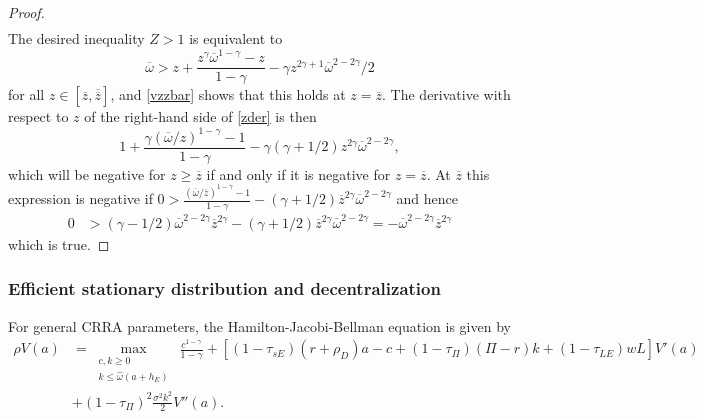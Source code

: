 \documentclass[11pt]{article}
\theoremstyle{plain}
\theoremstyle{definition} %
\begin{document}
\begin{proof}
\begin{equation}
\begin{aligned}
\label{vzzbar}
\end{aligned}
\end{equation} 
The desired inequality $Z > 1$ is equivalent to
\begin{equation}
\overline{\omega} > z + \frac{z^{\gamma}\overline{\omega}^{1 - \gamma} - z}{1 - \gamma} - \gamma z^{2\gamma+1} \overline{\omega}^{2 - 2\gamma}/2
\label{zder}
\end{equation}
for all $z \in [\overline{z}, \overline{\overline{z}}]$, and \eqref{vzzbar} shows that this holds at $z = \overline{z}$. The derivative with respect to $z$ of the right-hand side of \eqref{zder} is then 
$$
1 + \frac{\gamma(\overline{\omega}/z)^{1 - \gamma} - 1}{1 - \gamma} - \gamma (\gamma+1/2)z^{2\gamma} \overline{\omega}^{2 - 2\gamma},
$$
which will be negative for $z \geq \overline{z}$ if and only if it is negative for $z = \overline{z}$. At $\overline{z}$ this expression is negative if $0 > \frac{(\overline{\omega}/\overline{z})^{1 - \gamma} - 1}{1 - \gamma} - (\gamma+1/2) \overline{z}^{2\gamma} \overline{\omega}^{2 - 2\gamma}$ and hence
\begin{align*}
0 & > (\gamma-1/2)\overline{\omega}^{2-2\gamma}\overline{z}^{2\gamma} - (\gamma+1/2)\overline{z}^{2\gamma} \overline{\omega}^{2 - 2\gamma}
= -\overline{\omega}^{2-2\gamma}\overline{z}^{2\gamma}
\end{align*}
which is true.
\end{proof}

\subsubsection{Efficient stationary distribution and decentralization} \label{decent}

For general CRRA parameters, the Hamilton-Jacobi-Bellman equation is given by
\begin{align*}
\rho V(a) & = \max_{\substack{c, k \geq 0 \\ k \leq \hat{\omega}(a+h_E) } } \ \frac{c^{1-\gamma}}{1-\gamma} + {\left[(1-\tau_{sE})(r + \rho_D)a - c + (1 - \tau_{\Pi})(\Pi - r)k + (1-\tau_{LE})wL\right]}V'(a)
\\ & + (1-\tau_{\Pi})^2\frac{\sigma^2k^2}{2} V''(a) .
\end{align*}
\end{document}

